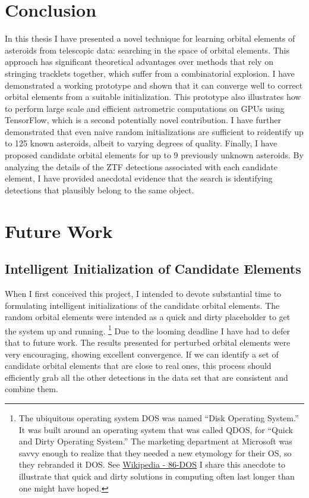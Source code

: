 \section{Conclusion}
\label{search_conclusion}
In this thesis I have presented a novel technique for learning orbital elements of asteroids from telescopic data: searching in the space of orbital elements.
This approach has significant theoretical advantages over methods that rely on stringing tracklets together, which suffer from a combinatorial explosion.
I have demonstrated a working prototype and shown that it can converge well to correct orbital elements from a suitable initialization.
This prototype also illustrates how to perform large scale and efficient astrometric computations on GPUs using TensorFlow,
which is a second potentially novel contribution.
I have further demonstrated that even naive random initializations are sufficient to reidentify up to 125 known asteroids, albeit to varying degrees of quality.
Finally, I have proposed candidate orbital elements for up to 9 previously unknown asteroids.
By analyzing the details of the ZTF detections associated with each candidate element,
I have provided anecdotal evidence that the search is identifying detections that plausibly belong to the same object.

\section{Future Work}
\label{section_future_work}

\subsection{Intelligent Initialization of Candidate Elements}
\label{subsection_intelligent_initialization}
When I first conceived this project, I intended to devote substantial time to formulating intelligent initializations of the candidate orbital elements.
The random orbital elements were intended as a quick and dirty placeholder to get the system up and running.
\footnote{The ubiquitous operating system DOS was named ``Disk Operating System.''
It was built around an operating system that was called QDOS, for ``Quick and Dirty Operating System.''
The marketing department at Microsoft was savvy enough to realize that they needed a new etymology 
for their OS, so they rebranded it DOS.
See \href{https://en.wikipedia.org/wiki/86-DOS}{Wikipedia - 86-DOS}
I share this anecdote to illustrate that quick and dirty solutions in computing often last longer than one might have hoped.}
Due to the looming deadline I have had to defer that to future work.
The results presented for perturbed orbital elements were very encouraging, showing excellent convergence.
If we can identify a set of candidate orbital elements that are close to real ones, this process should efficiently grab
all the other detections in the data set that are consistent and combine them.

